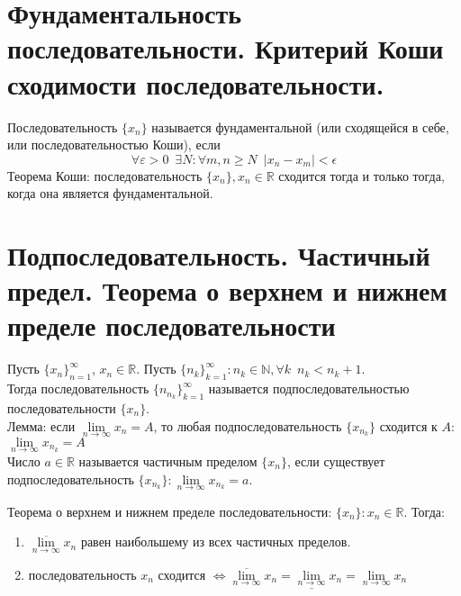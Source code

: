 \documentclass[11pt, a4paper]{article}
\def\R{\mathbb{R}}
\def\N{\mathbb{N}}
\def\sp{\, \, \,}
\def\linf{\lim \limits_{n \to \infty}}
\begin{document}
    \section{Фундаментальность последовательности. Критерий Коши сходимости последовательности.}
    Последовательность $\{x_n\}$ называется фундаментальной (или сходящейся в себе, или последовательностью Коши), если
    $$\forall \varepsilon > 0 \sp \exists N: \forall m,n \geq N \sp |x_n - x_m| < \epsilon$$
    Теорема Коши: последовательность $\{x_n\}, x_n \in \R$ сходится тогда и только тогда, когда она является фундаментальной.

    \section{Подпоследовательность. Частичный предел. Теорема о верхнем и нижнем пределе последовательности}
    Пусть $\{x_n\}_{n=1}^{\infty}$, $x_n \in \R$. Пусть $\{n_k\}_{k=1}^{\infty}: n_k \in \N , \forall k \sp n_k < n_k+1$.\\
    Тогда последовательность $\{n_{n_k}\}_{k=1}^{\infty}$ называется подпоследовательностью последовательности $\{x_n\}$.\\
    
    Лемма: если $\linf x_n = A$, то любая подпоследовательность $\{x_{n_k}\}$ сходится к $A$: $\linf x_{n_k} = A$\\
    
    Число $a \in \R$ называется частичным пределом $\{x_n\}$, если существует подпоследовательность $\{x_{n_k}\}: \linf x_{n_k} = a$.
    
    Теорема о верхнем и нижнем пределе последовательности: $\{x_n\}: x_n \in \R$. Тогда:
    \begin{enumerate}
        \item $\overline{\linf} x_n$ равен наибольшему из всех частичных пределов.
        \item последовательность $x_n$ сходится $\iff \overline{\linf} x_n = \underline{\linf} x_n = \linf x_n$
    \end{enumerate}
\end{document}
